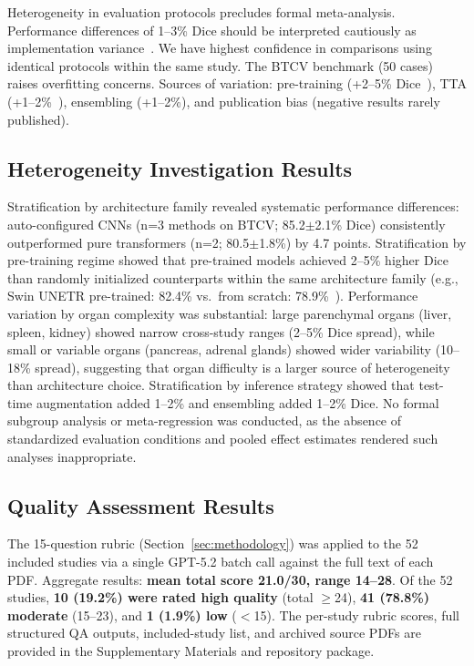 \documentclass[conference]{IEEEtran}
\begin{document}
Heterogeneity in evaluation protocols precludes formal meta-analysis. Performance differences of 1--3\% Dice should be interpreted cautiously as implementation variance~\cite{isensee2021nnunet}. We have highest confidence in comparisons using identical protocols within the same study. The BTCV benchmark (50 cases) raises overfitting concerns. Sources of variation: pre-training (+2--5\% Dice~\cite{swinunetr2022}), TTA (+1--2\%~\cite{isensee2021nnunet}), ensembling (+1--2\%), and publication bias (negative results rarely published).

\subsection{Heterogeneity Investigation Results}

Stratification by architecture family revealed systematic performance differences: auto-configured CNNs (n=3 methods on BTCV; 85.2$\pm$2.1\% Dice) consistently outperformed pure transformers (n=2; 80.5$\pm$1.8\%) by 4.7 points. Stratification by pre-training regime showed that pre-trained models achieved 2--5\% higher Dice than randomly initialized counterparts within the same architecture family (e.g., Swin UNETR pre-trained: 82.4\% vs.\ from scratch: 78.9\%~\cite{swinunetr2022}). Performance variation by organ complexity was substantial: large parenchymal organs (liver, spleen, kidney) showed narrow cross-study ranges (2--5\% Dice spread), while small or variable organs (pancreas, adrenal glands) showed wider variability (10--18\% spread), suggesting that organ difficulty is a larger source of heterogeneity than architecture choice. Stratification by inference strategy showed that test-time augmentation added 1--2\% and ensembling added 1--2\% Dice. No formal subgroup analysis or meta-regression was conducted, as the absence of standardized evaluation conditions and pooled effect estimates rendered such analyses inappropriate.

\subsection{Quality Assessment Results}
\label{sec:qa-results}

The 15-question rubric (Section~\ref{sec:methodology}) was applied to the 52 included studies via a single GPT-5.2 batch call against the full text of each PDF. Aggregate results: \textbf{mean total score 21.0/30, range 14--28}. Of the 52 studies, \textbf{10 (19.2\%) were rated high quality} (total $\geq$24), \textbf{41 (78.8\%) moderate} (15--23), and \textbf{1 (1.9\%) low} ($<$15). The per-study rubric scores, full structured QA outputs, included-study list, and archived source PDFs are provided in the Supplementary Materials and repository package.
\end{document}
